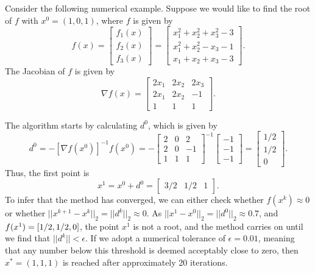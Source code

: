 	
Consider the following numerical example. Suppose we would like to find the root of $f$ with $x^0 = (1,0,1)$, where $f$ is given by 
	$$
	f(x) = \begin{bmatrix}f_1(x) \\ f_2(x) \\ f_3(x) \end{bmatrix} = \begin{bmatrix} x_1^2 + x_2^2 + x_3^2 -3 \\ x_1^2 + x_2^2 - x_3 - 1 \\ x_1 + x_2 + x_3 - 3 \end{bmatrix}.
	$$
	The Jacobian of $f$ is given by 
	$$
	\nabla f(x)=\begin{bmatrix} 2x_1 & 2x_2 & 2x_3 \\ 2x_1 & 2x_2 & -1 \\ 1 & 1 & 1\end{bmatrix}.
	$$
	
	The algorithm starts by calculating $d^0$, which is given by
	$$
	d^0 = -[\nabla f(x^0)]^{-1}f(x^0) = - \begin{bmatrix} 2 & 0 & 2 \\ 2 & 0 & -1 \\ 1 & 1 & 1\end{bmatrix}^{-1}\begin{bmatrix} -1 \\ -1 \\ -1 \end{bmatrix} = \begin{bmatrix} 1/2 \\ 1/2 \\ 0 \end{bmatrix}.
	$$ 
	Thus, the first point is 
	$$
	x^1 = x^0 + d^0 = \begin{bmatrix} 3/2 & 1/2 & 1\end{bmatrix}.
	$$ 
	To infer that the method has converged, we can either check whether $f(x^k) \approx 0$ or whether $||x^{k+1} - x^{k}||_2 = || d^{k} ||_2 \approx 0$. As $||x^1 - x^0||_2 = || d^0 ||_2 \approx 0.7$, and $f(x^1) = \left[ 1/2, 1/2, 0 \right]$, the point $x^1$ is not a root, and the method carries on until we find that $|| d^k|| < \epsilon$. If we adopt a numerical tolerance of $\epsilon = 0.01$, meaning that any number below this threshold is deemed acceptably close to zero, then $x^* = (1, 1, 1)$ is reached after approximately 20 iterations.	

